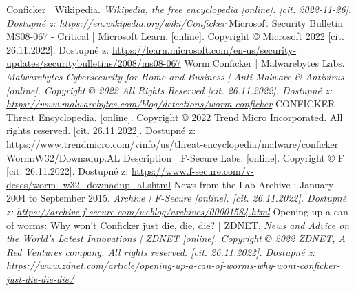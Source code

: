 \documentclass[a4paper,12pt]{article}
\begin{document}
{	
	{
		Conficker | Wikipedia.
		\it{Wikipedia, the free encyclopedia} [online]. [cit. 2022-11-26].
		Dostupné z: \url{https://en.wikipedia.org/wiki/Conficker}
	}	
	{
		Microsoft Security Bulletin MS08-067 - Critical | Microsoft Learn.
		[online]. Copyright © Microsoft 2022 [cit. 26.11.2022].
		Dostupné z: \url{https://learn.microsoft.com/en-us/security-updates/securitybulletins/2008/ms08-067}
	}
	{
		Worm.Conficker | Malwarebytes Labs.
		\it{Malwarebytes Cybersecurity for Home and Business | Anti-Malware \& Antivirus}
		[online]. Copyright © 2022 All Rights Reserved [cit. 26.11.2022].
		Dostupné z: \url{https://www.malwarebytes.com/blog/detections/worm-conficker}
	}
	{
		CONFICKER - Threat Encyclopedia.
		[online]. Copyright © 2022 Trend Micro Incorporated. All rights reserved. [cit. 26.11.2022].
		Dostupné z: \url{https://www.trendmicro.com/vinfo/us/threat-encyclopedia/malware/conficker}
	}
	{
		Worm:W32/Downadup.AL Description | F-Secure Labs.
		[online]. Copyright © F [cit. 26.11.2022].
		Dostupné z: \url{https://www.f-secure.com/v-descs/worm_w32_downadup_al.shtml}
	}
	{
		News from the Lab Archive : January 2004 to September 2015.
		\it{Archive | F-Secure} [online]. [cit. 26.11.2022].
		Dostupné z: \url{https://archive.f-secure.com/weblog/archives/00001584.html}
	}
	{
		Opening up a can of worms: Why won't Conficker just die, die, die? | ZDNET.
		\it{News and Advice on the World's Latest Innovations | ZDNET}
		[online]. Copyright © 2022 ZDNET, A Red Ventures company. All rights reserved. [cit. 26.11.2022].
		Dostupné z: \url{https://www.zdnet.com/article/opening-up-a-can-of-worms-why-wont-conficker-just-die-die-die/}
	}
}





\seznamobr  %


\seznamtab  %




\end{document}
